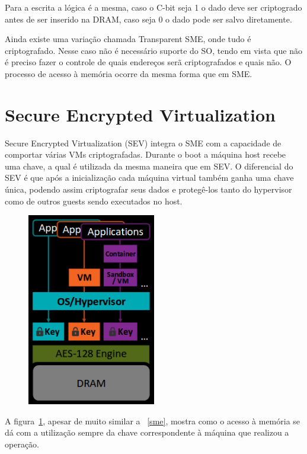 \documentclass{report}
\begin{document}
Para a escrita a lógica é a mesma, caso o C-bit seja 1 o dado deve ser
criptogrado antes de ser inserido na DRAM, caso seja 0 o dado pode ser salvo
diretamente.

Ainda existe uma variação chamada Transparent SME, onde tudo é criptografado.
Nesse caso não é necessário suporte do SO, tendo em vista que não é preciso
fazer o controle de quais endereços serã criptografados e quais não. O processo
de acesso à memória ocorre da mesma forma que em SME\@.


\section{Secure Encrypted Virtualization}
Secure Encrypted Virtualization (SEV) integra o SME com a capacidade de
comportar várias VMs criptografadas. Durante o boot a máquina host recebe uma
chave, a qual é utilizada da mesma maneira que em SEV. O diferencial do SEV é
que após a inicialização cada máquina virtual também ganha uma chave única,
podendo assim criptografar seus dados e protegê-los tanto do hypervisor como de
outros guests sendo executados no host.

\begin{figure}[h]
    \centering
    \includegraphics[width=0.5\textwidth]{img/sev}
    \label{sev}
\end{figure}

A figura~\ref{sev}, apesar de muito similar a ~\ref{sme}, mostra como o
acesso à memória se dá com a utilização sempre da chave correspondente à
máquina que realizou a operação.
\end{document}
